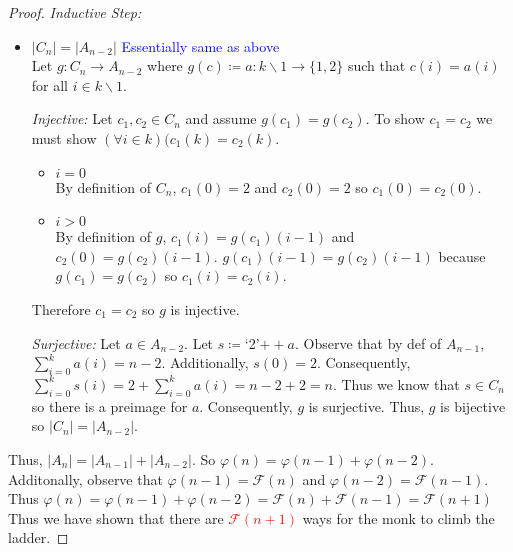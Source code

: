 \documentclass{article}
\newcommand{\defeq}{\coloneqq}
\newcommand{\fibonacci}{\mathcal{F}}
\newcommand{\concat}{+\!\!\!+}
\newenvironment{case}[1][Case]
    {\par\textit{#1:}\hfill\break}
    {}
\begin{document}
\begin{enumerate}
\begin{proof}
\begin{case}[Inductive Step]
\begin{itemize}
            \item[] \!\!\!\!\!$|C_n|=|A_{n-2}|$ \textcolor{blue}{Essentially same as above}\\
                Let $g:C_n \to A_{n-2}$ where $g(c)\defeq a: k\backslash1 \to \{1,2\}$ such that $c(i)=a(i)$ for all $i \in k\backslash1$.
                \begin{case}[Injective]
                    Let $c_1,c_2 \in C_n$ and assume $g(c_1)=g(c_2)$. To show $c_1=c_2$ we must show $(\forall i \in k)(c_1(k)=c_2(k)$.
                    \begin{itemize}
                        \item []$i=0$\\
                            By definition of $C_n$, $c_1(0)=2$ and $c_2(0)=2$ so $c_1(0)=c_2(0)$.
                        \item []$i>0$\\
                            By definition of $g$, $c_1(i)=g(c_1)(i-1)$ and $c_2(0)=g(c_2)(i-1)$. $g(c_1)(i-1)=g(c_2)(i-1)$ because $g(c_1)=g(c_2)$ so $c_1(i)=c_2(i)$.
                    \end{itemize}
                    Therefore $c_1=c_2$ so $g$ is injective.
                \end{case}
                \begin{case}[Surjective]
                    Let $a \in A_{n-2}$. Let $s\defeq$`2'$\concat a$. Observe that by def of $A_{n-1}$, $\sum_{i=0}^{k}a(i)=n-2$. Additionally, $s(0)=2$. Consequently, $\sum_{i=0}^{k}s(i)=2+\sum_{i=0}^{k}a(i)=n-2+2=n$.  Thus we know that $s \in C_n$ so there is a preimage for $a$. Consequently, $g$ is surjective.
                \end{case}
                Thus, $g$ is bijective so $|C_n|=|A_{n-2}|$.
        \end{itemize}
        Thus, $|A_n| = |A_{n-1}|+|A_{n-2}|$. So $\varphi(n)=\varphi(n-1)+\varphi(n-2)$. Additonally, observe that $\varphi(n-1)=\fibonacci(n)$ and $\varphi(n-2)=\fibonacci(n-1)$.
        Thus $\varphi(n)=\varphi(n-1)+\varphi(n-2)=\fibonacci(n)+\fibonacci(n-1)=\fibonacci(n+1)$
    \end{case}
    Thus we have shown that there are \textcolor{red}{$\fibonacci(n+1)$} ways for the monk to climb the ladder.
    \end{proof}
\end{enumerate}
\end{document}
